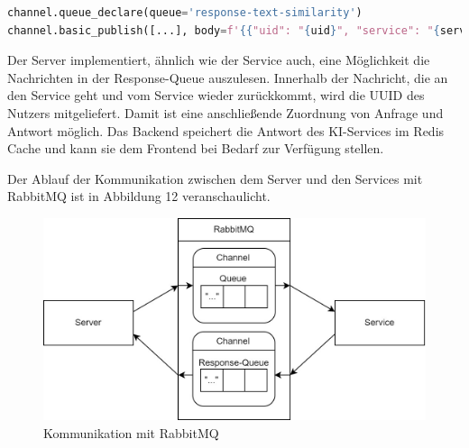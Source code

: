 \begin{lstlisting}[language=Python, caption={Senden eines KI-Ergebnisses an das Backend }]
channel.queue_declare(queue='response-text-similarity')
channel.basic_publish([...], body=f'{{"uid": "{uid}", "service": "{service}", "message": {json.dumps(message)}}}'.encode('utf-8'))
\end{lstlisting}

Der Server implementiert, ähnlich wie der Service auch, eine Möglichkeit die Nachrichten in der Response-Queue auszulesen. Innerhalb der Nachricht, die an den Service geht und vom Service wieder zurückkommt, wird die UUID des Nutzers mitgeliefert. Damit ist eine anschließende Zuordnung von Anfrage und Antwort möglich. Das Backend speichert die Antwort des KI-Services im Redis Cache und kann sie dem Frontend bei Bedarf zur Verfügung stellen.

Der Ablauf der Kommunikation zwischen dem Server und den Services mit RabbitMQ ist in Abbildung 12 veranschaulicht. 
\begin{figure}[H]
  \centering
    \includegraphics[width = 15cm]{bilder/Rabbit3}
    \caption{Kommunikation mit RabbitMQ}
\end{figure}

